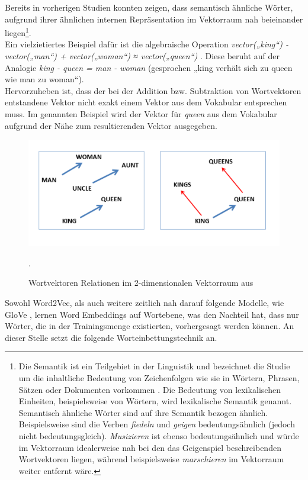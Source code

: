 \documentclass[ngerman]{ttlab-qualify}
\begin{document}
\noindent Bereits in vorherigen Studien konnten \textcite{mikolov-etal-2013-linguistic} zeigen, dass semantisch ähnliche Wörter, aufgrund ihrer ähnlichen internen Repräsentation im Vektorraum nah beieinander liegen\footnote{Die Semantik ist ein Teilgebiet in der Linguistik und bezeichnet die Studie um die inhaltliche Bedeutung von Zeichenfolgen wie sie in Wörtern, Phrasen, Sätzen oder Dokumenten vorkommen \parencite{Jurafsky:2009:SLP:1214993}. Die Bedeutung von lexikalischen Einheiten, beispielsweise von Wörtern, wird lexikalische Semantik genannt. Semantisch ähnliche Wörter sind auf ihre Semantik bezogen ähnlich. Beispielsweise sind die Verben \textit{fiedeln} und \textit{geigen} bedeutungsähnlich (jedoch nicht bedeutungsgleich). \textit{Musizieren} ist ebenso bedeutungsähnlich und würde im Vektorraum idealerweise nah bei den das Geigenspiel beschreibenden Wortvektoren liegen, während beispielsweise \textit{marschieren} im Vektorraum weiter entfernt wäre.}.\\
Ein vielzietiertes Beispiel dafür ist die algebraische Operation  \textit{vector(„king“) - vector(„man“) + vector(„woman“) ≈ vector(„queen“)} \parencite[vgl.][1]{mikolov-etal-2013-linguistic}. Diese beruht auf der Analogie \textit{king - queen = man - woman} (gesprochen „king verhält sich zu queen wie man zu woman“).\\
Hervorzuheben ist, dass der bei der Addition bzw. Subtraktion von Wortvektoren entstandene Vektor nicht exakt einem Vektor aus dem Vokabular entsprechen muss. Im genannten Beispiel wird der Vektor für \textit{queen} aus dem Vokabular aufgrund der Nähe zum resultierenden Vektor ausgegeben.
\begin{figure}[H]
\begin{center}
\includegraphics[width=12cm]{grafiken/king_queen_analogy.jpeg}
\caption[Wortvektoren Relationen im 2-dimensionalen Vektorraum]{Wortvektoren Relationen im 2-dimensionalen Vektorraum aus \textcite[5]{mikolov-etal-2013-linguistic}}.
\label{king_queen}
\end{center}
\end{figure}
\noindent Sowohl Word2Vec, als auch weitere zeitlich nah darauf folgende Modelle, wie GloVe \parencite{pennington2014glove}, lernen Word Embeddings auf Wortebene, was den Nachteil hat, dass nur Wörter, die in der Trainingsmenge existierten, vorhergesagt werden können. An dieser Stelle setzt die folgende Worteinbettungstechnik an.
\end{document}
